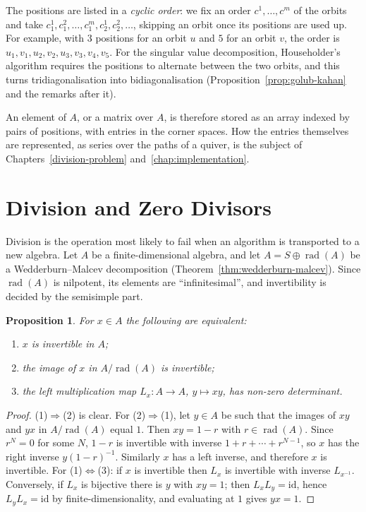 \documentclass[12pt, a4paper]{report}
\theoremstyle{plain}
\newtheorem{proposition}[theorem]{Proposition}
\theoremstyle{definition}
\theoremstyle{remark}
\theoremstyle{plain}
\newcommand{\rad}[0]{\operatorname{rad}} %
\begin{document}
The positions are listed in a \emph{cyclic order}: we fix an order $c^1,\dots,c^m$ of the orbits and take $c^1_1,c^2_1,\dots,c^m_1,c^1_2,c^2_2,\dots$, skipping an orbit once its positions are used up. For example, with $3$ positions for an orbit $u$ and $5$ for an orbit $v$, the order is $u_1,v_1,u_2,v_2,u_3,v_3,v_4,v_5$. For the singular value decomposition, Householder's algorithm requires the positions to alternate between the two orbits, and this turns tridiagonalisation into bidiagonalisation (Proposition~\ref{prop:golub-kahan} and the remarks after it).

An element of $A$, or a matrix over $A$, is therefore stored as an array indexed by pairs of positions, with entries in the corner spaces. How the entries themselves are represented, as series over the paths of a quiver, is the subject of Chapters~\ref{division-problem} and~\ref{chap:implementation}.

\section{Division and Zero Divisors}
\label{sec:division}
Division is the operation most likely to fail when an algorithm is transported to a new algebra. Let $A$ be a finite-dimensional algebra, and let $A=S\oplus\rad(A)$ be a Wedderburn--Malcev decomposition (Theorem~\ref{thm:wedderburn-malcev}). Since $\rad(A)$ is nilpotent, its elements are ``infinitesimal'', and invertibility is decided by the semisimple part.

\begin{proposition}\label{prop:invertibility}
For $x\in A$ the following are equivalent:
\begin{enumerate}
  \item $x$ is invertible in $A$;
  \item the image of $x$ in $A/\rad(A)$ is invertible;
  \item the left multiplication map $L_x:A\to A$, $y\mapsto xy$, has non-zero determinant.
\end{enumerate}
\end{proposition}
\begin{proof}
(1)$\Rightarrow$(2) is clear. For (2)$\Rightarrow$(1), let $y\in A$ be such that the images of $xy$ and $yx$ in $A/\rad(A)$ equal $1$. Then $xy=1-r$ with $r\in\rad(A)$. Since $r^N=0$ for some $N$, $1-r$ is invertible with inverse $1+r+\cdots+r^{N-1}$, so $x$ has the right inverse $y(1-r)^{-1}$. Similarly $x$ has a left inverse, and therefore $x$ is invertible. For (1)$\Leftrightarrow$(3): if $x$ is invertible then $L_x$ is invertible with inverse $L_{x^{-1}}$. Conversely, if $L_x$ is bijective there is $y$ with $xy=1$; then $L_xL_y=\mathrm{id}$, hence $L_yL_x=\mathrm{id}$ by finite-dimensionality, and evaluating at $1$ gives $yx=1$.
\end{proof}
\end{document}
